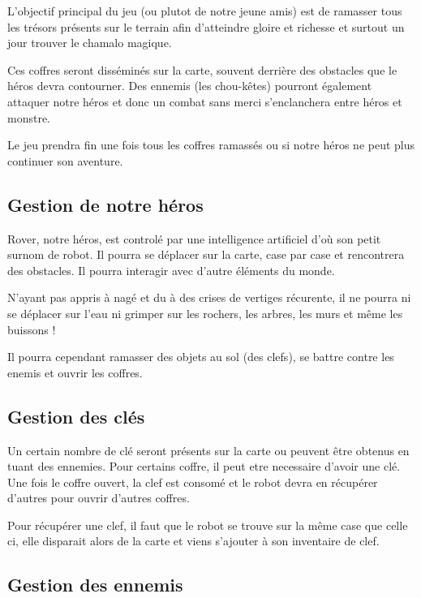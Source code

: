 \documentclass[a4paper 12pts]{article}
\begin{document}
L'objectif  principal du jeu (ou plutot de notre jeune amis) est de ramasser tous les trésors présents 
sur le terrain afin d'atteindre gloire et richesse et surtout un jour trouver le chamalo magique.

Ces coffres seront disséminés sur la carte, souvent derrière des obstacles que le héros devra contourner. 
Des ennemis (les chou-kêtes) pourront également attaquer notre héros et donc un combat sans merci s'enclanchera entre héros et monstre.

Le jeu prendra fin une fois tous les coffres ramassés ou si notre héros ne peut plus continuer son aventure.


\subsection{Gestion de notre héros}

Rover, notre héros, est controlé par une intelligence artificiel d'où son petit surnom de robot.
Il pourra se déplacer sur la carte, case par case et rencontrera des obstacles. 
Il pourra interagir avec d'autre éléments du monde. 

N'ayant pas appris à nagé et du à des crises de vertiges récurente, il ne pourra ni se déplacer sur l'eau ni grimper sur les rochers,
les arbres, les murs et même les buissons !

Il pourra cependant ramasser des objets au sol (des clefs), se battre contre les enemis et ouvrir les coffres. 

\subsection{Gestion des clés}


Un certain nombre de clé seront présents sur la carte ou peuvent être obtenus en tuant des ennemies.
Pour certains coffre, il peut etre necessaire d'avoir une clé. 
Une fois le coffre ouvert, la clef est consomé et le robot devra en récupérer d'autres pour ouvrir d'autres coffres.

Pour récupérer une clef, il faut que le robot se trouve sur la même case que celle ci, elle disparait alors de la carte et 
viens s'ajouter à son inventaire de clef.

\subsection{Gestion des ennemis}
\end{document}
